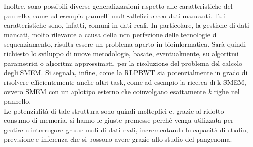 \documentclass[a4paper,11pt, oneside,italian]{article}
\begin{document}
Inoltre, sono possibili diverse generalizzazioni rispetto alle caratteristiche
del pannello, come ad esempio pannelli multi-allelici o con dati mancanti. Tali
caratteristiche sono, infatti, comuni in dati reali. In particolare, la gestione
di dati 
mancati, molto rilevante a causa della non perfezione delle tecnologie di
sequenziamento, risulta essere un problema aperto in bioinformatica. Sarà
quindi richiesto lo sviluppo di nuove metodologie, basate, eventualmente,
su algoritmi parametrici o algoritmi approssimati, per la risoluzione del
problema del calcolo degli SMEM.
Si segnala, infine, come la RLPBWT sia potenzialmente in grado di
risolvere 
efficientemente anche altri task, come ad esempio la ricerca di k-SMEM,
ovvero SMEM con un aplotipo esterno che coinvolgano
esattamente $k$ righe nel pannello. \\
Le potenzialità di tale struttura sono quindi molteplici e, grazie al ridotto
consumo di memoria, si hanno le giuste premesse perché venga utilizzata per
gestire e interrogare grosse moli di dati reali, incrementando le capacità di
studio, previsione e inferenza che si possono avere grazie allo studio del
pangenoma.
\end{document}
